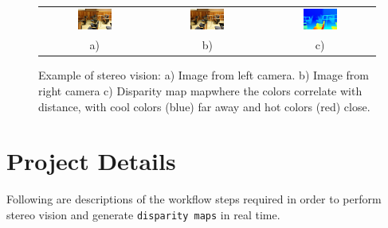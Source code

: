 \documentclass[11pt,fleqn]{article}
\begin{document}
\begin{figure}[!h]
\begin{mdframed}
\centering
\setlength{}
\begin{tabular}{ccc}
\includegraphics[width=0.33\textwidth]{images/im0-600.jpg} &
\includegraphics[width=0.33\textwidth]{images/im1-600.jpg} &
\includegraphics[width=0.33\textwidth]{images/disp-600.jpg} \\[2pt]
a) & b) & c)
\end{tabular}
\caption[Example of stereo vision]{Example of stereo vision: a) Image from left camera. b) Image from right camera c) Disparity map mapwhere the colors correlate with distance, with cool colors (blue) far away and hot colors (red) close.}
\label{fig:example1}
\end{mdframed}
\end{figure}


\section{Project Details}

Following are descriptions of the workflow steps required in order to perform stereo vision and generate \texttt{disparity maps} in real time.
\end{document}
